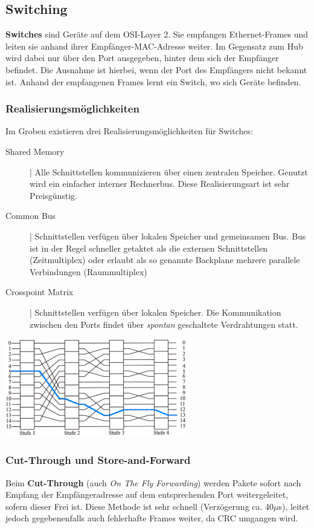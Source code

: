 \documentclass{article} %
\begin{document}
\subsection{Switching}

\textbf{Switches} sind Geräte auf dem OSI-Layer 2.
Sie empfangen Ethernet-Frames und leiten sie anhand ihrer Empfänger-MAC-Adresse weiter.
Im Gegensatz zum Hub wird dabei nur über den Port ausgegeben, hinter dem sich der Empfänger befindet.
Die Ausnahme ist hierbei, wenn der Port des Empfängers nicht bekannt ist.
Anhand der empfangenen Frames lernt ein Switch, wo sich Geräte befinden.

\subsubsection{Realisierungsmöglichkeiten}
Im Groben existieren drei Realisierungsmöglichkeiten für Switches:
\begin{description}
	\item[Shared Memory] | Alle Schnittstellen kommunizieren über einen zentralen Speicher.
	Genutzt wird ein einfacher interner Rechnerbus.
	Diese Realisierungsart ist sehr Preisgünstig.
	\item[Common Bus] | Schnittstellen verfügen über lokalen Speicher und gemeinsamen Bus.
	Bus ist in der Regel schneller getaktet als die externen Schnittstellen 	(Zeitmultiplex) oder erlaubt als so genannte Backplane mehrere 	parallele Verbindungen (Raummultiplex)
	\item[Crosspoint Matrix] | Schnittstellen verfügen über lokalen Speicher.
	Die Kommunikation zwischen den Ports findet über \emph{spontan} geschaltete Verdrahtungen statt.
\end{description}
\begin{center}
	\includegraphics[width=8cm]{img/crosspoint_matrix}
\end{center}


\subsubsection{Cut-Through und Store-and-Forward}
Beim \textbf{Cut-Through} (auch \emph{On The Fly Forwarding}) werden Pakete sofort nach Empfang der Empfängeradresse auf dem entsprechenden Port weitergeleitet, sofern dieser Frei ist.
Diese Methode ist sehr schnell (Verzögerung ca. 40$\mu$s), leitet jedoch gegebenenfalls auch fehlerhafte Frames weiter, da CRC umgangen wird.
\end{document}
